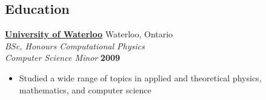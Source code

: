 \documentclass[margin,line]{res}
\begin{document}
\begin{resume}
%                
%      

  \section{\sc Education}
      \href{http://www.uwaterloo.ca}{\bf University of Waterloo} {\hfill Waterloo, Ontario}\\
      {\em BSc, Honours Computational Physics \\ Computer Science Minor} \hfill {\bf 2009}
      \begin{itemize} \itemsep -2pt
        \item Studied a wide range of topics in applied and theoretical physics, mathematics, and computer science
      \end{itemize}


\end{resume}
\end{document}
